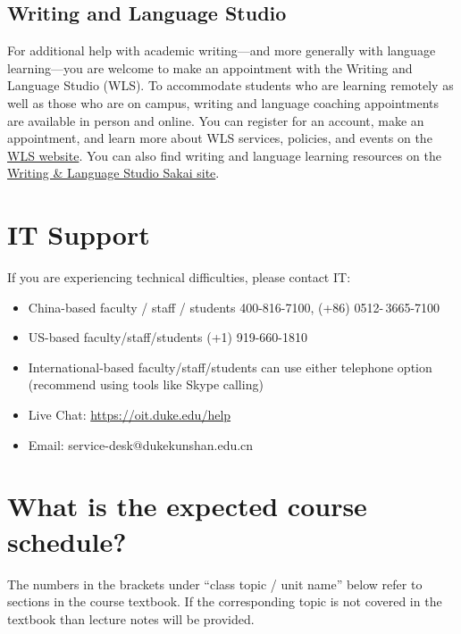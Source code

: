 \documentclass[11pt]{article}
\begin{document}
\subsection{Writing and Language Studio}

For additional help with academic writing---and more generally with language learning---you are welcome to make an appointment with the Writing and Language Studio (WLS). To accommodate students who are learning remotely as well as those who are on campus, writing and language coaching appointments are available in person and online. You can register for an account, make an appointment, and learn more about WLS services, policies, and events on the \href{https://dukekunshan.edu.cn/en/academics/language-and-culture-center/writing-and-language-studio}{WLS website}. You can also find writing and language learning resources on the \href{https://sakai.duke.edu/x/mQ6xqG}{Writing \& Language Studio Sakai site}.



\section{IT Support}

If you are experiencing technical difficulties, please contact IT:
\begin{itemize}[label={-},noitemsep]
\item China-based faculty / staff / students 400-816-7100, (+86) 0512- 3665-7100
\item US-based faculty/staff/students (+1) 919-660-1810
\item International-based faculty/staff/students can use either telephone option (recommend using tools like Skype calling)
\item Live Chat:  \url{https://oit.duke.edu/help}
\item Email:  service-desk@dukekunshan.edu.cn
\end{itemize}



\section{What is the expected course schedule?}

The numbers in the brackets under “class topic / unit name” below refer to sections in the course textbook. If the corresponding topic is not covered in the textbook than lecture notes will be provided.
\end{document}
